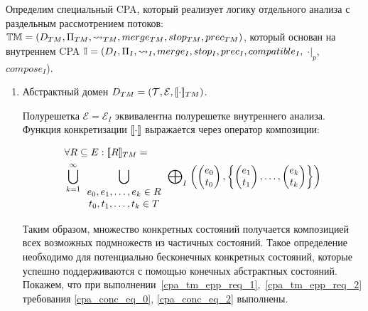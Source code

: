 Определим специальный CPA, который реализует логику отдельного анализа с раздельным рассмотрением потоков: $\mathbb{TM}=(D_{TM}, \Pi_{TM}, \leadsto_{TM}, merge_{TM}, stop_{TM}, prec_{TM})$, который основан на внутреннем CPA $\mathbb{I}=(D_{I}, \Pi_{I}, \leadsto_{I}, merge_{I}, stop_{I}, prec_{I}, compatible_{I},$ $\cdot|_p,$ $compose_I$).

\begin{enumerate}

\item Абстрактный домен $D_{TM}=(\mathcal{T}, \mathcal{E}, [\![ \cdot ]\!]_{TM})$.

Полурешетка $\mathcal{E}=\mathcal{E}_I$ эквивалентна полурешетке внутреннего анализа.
Функция конкретизации $[\![ \cdot ]\!]$ выражается через оператор композиции:

\begin{equation}
\label{cpa_conc_tm_def}
\begin{aligned}
& \forall R \subseteq E: [\![ R ]\!]_{TM} = \\ & \bigcup_{k=1}^{\infty}{ 
\bigcup_{
\begin{array}{c}
e_0, e_1,\dots,e_k \in R \\
t_0, t_1,\dots,t_k \in T
\end{array}
} {
\mathrel{\bigoplus}_I
\left(
\begin{pmatrix}
e_0 \\
t_0 
\end{pmatrix},
\left\{
\begin{pmatrix}
e_1 \\
t_1 
\end{pmatrix},
\dots ,
\begin{pmatrix}
e_k \\
t_k 
\end{pmatrix}
\right\}
\right)
}
}
\end{aligned}
\end{equation}

Таким образом, множество конкретных состояний получается композицией всех возможных подмножеств из частичных состояний.
Такое определение необходимо для потенциально бесконечных конкретных состояний, которые успешно поддерживаются с помощью конечных абстрактных состояний.
Покажем, что при выполнении~\ref{cpa_tm_epp_req_1},~\ref{cpa_tm_epp_req_2} требования \ref{cpa_conc_eq_0}, \ref{cpa_conc_eq_2} выполнены.


\end{enumerate}

